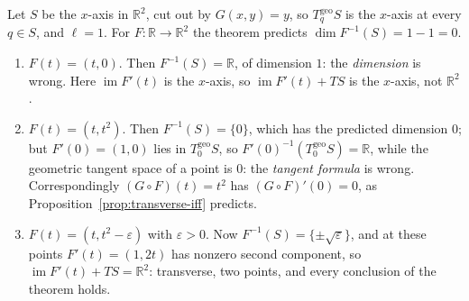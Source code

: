 \documentclass[11pt]{report}
\makeatletter
\newcounter{excounter}[section]
\newcommand{\exlabel}[1]{\edef\@currentlabel{\arabic{section}.\arabic{excounter}}\label{#1}}
\newcommand{\geo}{\mathrm{geo}}
\makeatother
\begin{document}
\begin{exbox}\exlabel{ex:transverse-failures}
Let $S$ be the $x$-axis in $\mathbb{R}^2$, cut out by $G(x,y) = y$, so $T^{\geo}_qS$ is the $x$-axis at every $q \in S$, and $\ell = 1$. For $F : \mathbb{R} \to \mathbb{R}^2$ the theorem predicts $\dim F^{-1}(S) = 1 - 1 = 0$.
\begin{enumerate}
    \item[(a)] $F(t) = (t, 0)$. Then $F^{-1}(S) = \mathbb{R}$, of dimension $1$: the \emph{dimension} is wrong. Here $\operatorname{im} F'(t)$ is the $x$-axis, so $\operatorname{im} F'(t) + T S$ is the $x$-axis, not $\mathbb{R}^2$.
    \item[(b)] $F(t) = (t, t^2)$. Then $F^{-1}(S) = \{0\}$, which has the predicted dimension $0$; but $F'(0) = (1,0)$ lies in $T^{\geo}_0S$, so $F'(0)^{-1}(T^{\geo}_0S) = \mathbb{R}$, while the geometric tangent space of a point is $0$: the \emph{tangent formula} is wrong. Correspondingly $(G \circ F)(t) = t^2$ has $(G\circ F)'(0) = 0$, as Proposition~\ref{prop:transverse-iff} predicts.
    \item[(c)] $F(t) = (t, t^2 - \varepsilon)$ with $\varepsilon > 0$. Now $F^{-1}(S) = \{\pm\sqrt\varepsilon\}$, and at these points $F'(t) = (1, 2t)$ has nonzero second component, so $\operatorname{im} F'(t) + TS = \mathbb{R}^2$: transverse, two points, and every conclusion of the theorem holds.
\end{enumerate}
\end{exbox}
\end{document}
